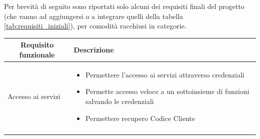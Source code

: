 Per brevità di seguito sono riportati solo alcuni dei requisiti finali del progetto (che vanno ad aggiungersi o a integrare quelli della tabella \ref{tab:requisiti_iniziali}), per comodità racchiusi in categorie.
\begin{center}

    \begin{longtable}{p{6cm}|p{8cm}}

    \toprule
    \multicolumn{1}{c}{\textbf{Requisito funzionale}} &
    \textbf{Descrizione}\\

    \midrule
    Accesso ai servizi & \begin{itemize}
                          \item Permettere l'accesso ai servizi attraverso credenziali
                          \item Permette accesso veloce a un sottoinsieme di funzioni salvando le credenziali
                          \item Permettere recupero Codice Cliente
                         \end{itemize}\\\\


\end{longtable}
\end{center}
